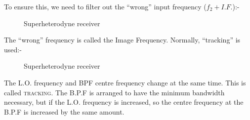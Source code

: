 \documentclass[11pt]{article} %
\begin{document}
To ensure this, we need to filter out the ``wrong'' input frequency ($f_2+I.F.$):-
\begin{figure}[h]
	\centering
	\begin{tikzpicture}
	\end{tikzpicture}
	\label{fig:superhetbpf}
	\caption{Superheterodyne receiver}
\end{figure}

The ``wrong'' frequency is called the Image Frequency. Normally, ``tracking'' is used:-
\begin{figure}[h]
	\centering
	\begin{tikzpicture}
	\end{tikzpicture}
	\label{fig:superhettracking}
	\caption{Superheterodyne receiver}
\end{figure}

The L.O. frequency and BPF centre frequency change at the same time. This is called \textsc{tracking}. The B.P.F is arranged to have the minimum bandwidth necessary, but if the L.O. frequency is increased, so the centre frequency at the B.P.F is increased by the same amount.
\end{document}

